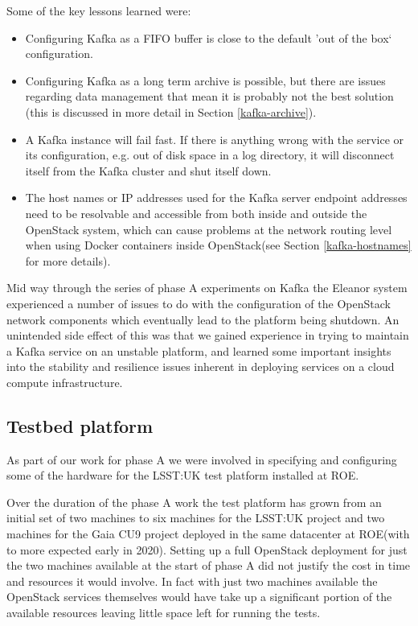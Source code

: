 \documentclass{article}
\newcommand{\docker} {Docker\xspace}
\newcommand{\openstack} {OpenStack\xspace}
\newcommand{\datacenter} {datacenter\xspace}
\newcommand{\kafka} {Kafka\xspace}
\newcommand{\fifo} {FIFO\xspace}
\newcommand{\phasea} {phase A\xspace}
\newcommand{\lsstuk} {LSST:UK\xspace}
\newcommand{\gaia} {Gaia\xspace}
\newcommand{\cunine} {CU9\xspace}
\newcommand{\roe} {ROE\xspace}
\newcommand{\testplatform} {test platform\xspace}
\newcommand{\eleanor} {Eleanor\xspace}
\newcommand{\hdisk} {disk\xspace}
\begin{document}
Some of the key lessons learned were:
\begin{itemize}
    \item Configuring \kafka as a \fifo buffer is close to the default 'out of the box` configuration.
    \item Configuring \kafka as a long term archive is possible, but there are issues regarding data management that mean it is probably not the best solution (this is discussed in more detail in Section \ref{kafka-archive}). 
    \item A \kafka instance will fail fast. If there is anything wrong with the service or its configuration, e.g. out of \hdisk space in a log directory, it will disconnect itself from the \kafka cluster and shut itself down.
    \item The host names or IP addresses used for the \kafka server endpoint addresses need to be resolvable and accessible from both inside and outside the \openstack system, which can cause problems at the network routing level when using \docker containers inside \openstack (see Section \ref{kafka-hostnames} for more details).
\end{itemize}

Mid way through the series of \phasea experiments on \kafka the \eleanor system experienced a number of issues to do with the configuration of the \openstack network components which eventually lead to the platform being shutdown.
An unintended side effect of this was that we gained experience in trying to maintain a \kafka service on an unstable platform, and learned some important insights into the stability and resilience issues inherent in deploying services on a cloud compute infrastructure.

\subsection{Testbed platform}
\label{deployment-testbed.platform}

As part of our work for \phasea we were involved in specifying and configuring some of the hardware for the \lsstuk \testplatform installed at \roe.

Over the duration of the \phasea work the \testplatform has grown from an initial set of two machines to six machines for the \lsstuk project and two machines for the \gaia \cunine project deployed in the same \datacenter at \roe (with to more expected early in 2020). Setting up a full \openstack deployment for just the two machines available at the start of \phasea did not justify the cost in time and resources it would involve. In fact with just two machines available the \openstack services themselves would have take up a significant portion of the available resources leaving little space left for running the tests.
\end{document}
